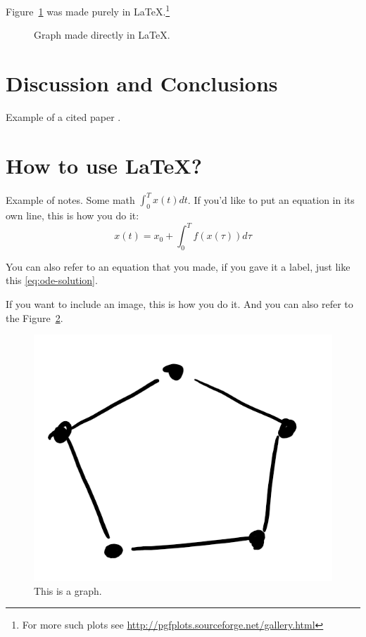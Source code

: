\documentclass{amsart}
\begin{document}
Figure~\ref{fig:csvfig} was made purely in \LaTeX.\footnote{For more such plots see \url{http://pgfplots.sourceforge.net/gallery.html}}

\begin{figure}[htb]
  \centering
\caption{Graph made directly in LaTeX.}\label{fig:csvfig}
\end{figure}
\section{Discussion and Conclusions}

Example of a cited paper \cite{Hill1894}.


\appendix

\section{How to use LaTeX?}

Example of notes. Some math $\int_0^Tx(t)dt$. If you'd like to put an equation in its own line, this is how you do it:
\begin{equation}
x(t) = x_0 + \int_0^T f(x(\tau))d\tau  \label{eq:ode-solution}
\end{equation}


You can also refer to an equation that you made, if you gave it a label, just like this \eqref{eq:ode-solution}.

If you want to include an image, this is how you do it. And you can also refer to the Figure~\ref{fig:graph}.
\begin{figure}
  \centering
  \includegraphics[width=0.2\linewidth]{figs/graph.png}
  \caption{This is a graph.}\label{fig:graph}
\end{figure}
\end{document}
